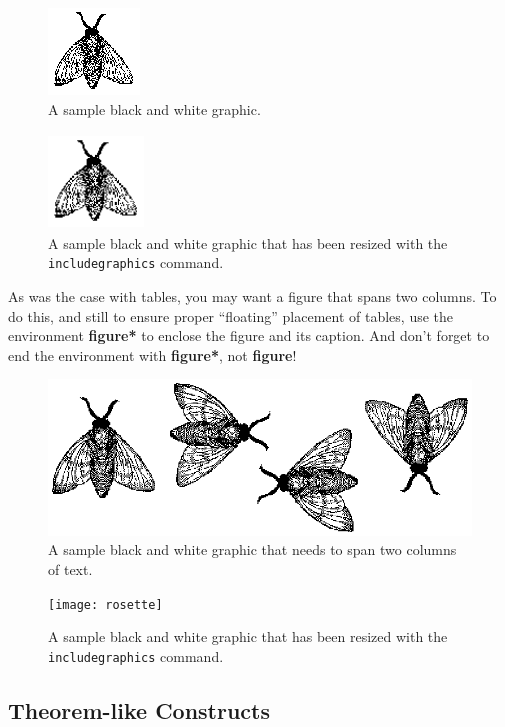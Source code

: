 \begin{figure}
\includegraphics{fly}
\caption{A sample black and white graphic.}
\end{figure}

\begin{figure}
\includegraphics[height=1in, width=1in]{fly}
\caption{A sample black and white graphic
that has been resized with the \texttt{includegraphics} command.}
\end{figure}


As was the case with tables, you may want a figure that spans two
columns.  To do this, and still to ensure proper ``floating''
placement of tables, use the environment \textbf{figure*} to enclose
the figure and its caption.  And don't forget to end the environment
with \textbf{figure*}, not \textbf{figure}!

\begin{figure}
\includegraphics{flies}
\caption{A sample black and white graphic
that needs to span two columns of text.}
\end{figure}


\begin{figure}
\texttt{[image: rosette]}
\caption{A sample black and white graphic that has
been resized with the \texttt{includegraphics} command.}
\end{figure}

\subsection{Theorem-like Constructs}

